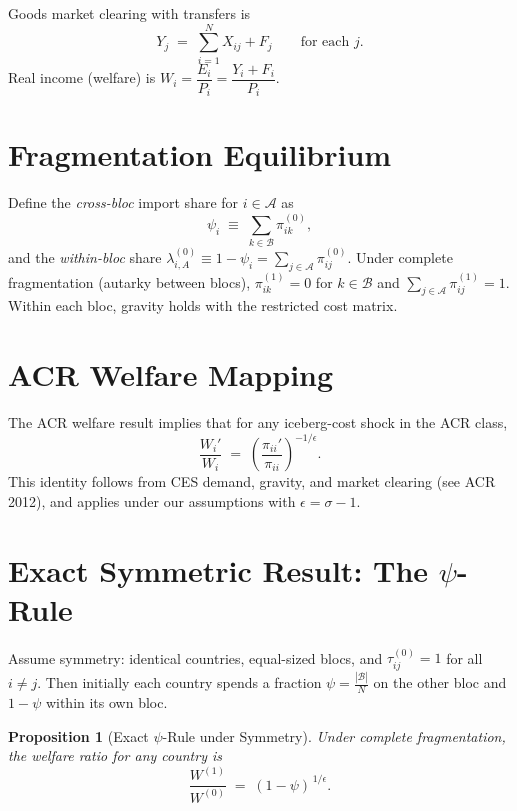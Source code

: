 \documentclass[11pt]{article}
\newtheorem{proposition}{Proposition}
\begin{document}
Goods market clearing with transfers is
\begin{equation}
Y_j \;=\; \sum_{i=1}^N X_{ij} + F_j \qquad \text{for each } j.
\end{equation}
Real income (welfare) is $W_i = \dfrac{E_i}{P_i} = \dfrac{Y_i+F_i}{P_i}$.

\section{Fragmentation Equilibrium}

Define the \emph{cross-bloc} import share for $i\in\mathcal{A}$ as
\begin{equation}
\psi_i \;\equiv\; \sum_{k\in \mathcal{B}} \pi_{ik}^{(0)},
\end{equation}
and the \emph{within-bloc} share $\lambda_{i,A}^{(0)} \equiv 1-\psi_i = \sum_{j\in \mathcal{A}} \pi_{ij}^{(0)}$. Under complete fragmentation (autarky between blocs), $\pi_{ik}^{(1)}=0$ for $k\in \mathcal{B}$ and $\sum_{j\in \mathcal{A}} \pi_{ij}^{(1)}=1$. Within each bloc, gravity holds with the restricted cost matrix.

\section{ACR Welfare Mapping}

The ACR welfare result implies that for any iceberg-cost shock in the ACR class,
\begin{equation}
\frac{W_i'}{W_i} \;=\; \left(\frac{\pi_{ii}'}{\pi_{ii}}\right)^{-1/\epsilon}.
\label{eq:ACR}
\end{equation}
This identity follows from CES demand, gravity, and market clearing (see ACR 2012), and applies under our assumptions with $\epsilon=\sigma-1$.

\section{Exact Symmetric Result: The $\psi$-Rule}

Assume symmetry: identical countries, equal-sized blocs, and $\tau_{ij}^{(0)}=1$ for all $i\neq j$. Then initially each country spends a fraction $\psi = \frac{|\mathcal{B}|}{N}$ on the other bloc and $1-\psi$ within its own bloc.

\begin{proposition}[Exact $\psi$-Rule under Symmetry]\label{prop:psi}
Under complete fragmentation, the welfare ratio for any country is
\begin{equation}
\frac{W^{(1)}}{W^{(0)}} \;=\; (1-\psi)^{\,1/\epsilon}.
\end{equation}
\end{proposition}
\end{document}
